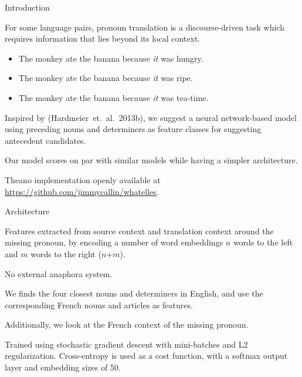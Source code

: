 \documentclass[dvipsnames,a0paper,portrait]{baposter}
\begin{document}
\begin{poster}
\begin{posterbox}[name=motivation,column=0,row=0.005]{Introduction}
\raggedright
\begin{compactitem}
\item For some language pairs, pronoun translation is a discourse-driven task which requires information that lies beyond its local context.
\begin{itemize}
    \setlength{\itemsep}{-0.2em}
    \item The monkey ate the banana because \emph{it} was hungry.
    \item The monkey ate the banana because \emph{it} was ripe.
    \item The monkey ate the banana because \emph{it} was tea-time.
\end{itemize}
\item Inspired by (Hardmeier~et.~al.~2013b), we suggest a neural network-based model using preceding nouns and determiners as feature classes for suggesting antecedent candidates.
\item Our model scores on par with similar models while having a simpler architecture.
\item Theano implementation openly available at \url{https://github.com/jimmycallin/whatelles}.
\end{compactitem}
\end{posterbox}


\begin{posterbox}[name=decoding,column=0,below=motivation]{Architecture}
\raggedright
\begin{compactitem}
\item Features extracted from source context and translation context around the missing pronoun, by encoding a number of word embeddings $n$ words to the left and $m$ words to the right ($n$+$m$).
\item No external anaphora system.
\item We finds the four closest nouns and determiners in English, and use the corresponding French nouns and articles as features.
\item Additionally, we look at the French context of the missing pronoun.
\item Trained using stochastic gradient descent with mini-batches and L2 regularization. Cross-entropy is used as a cost function, with a softmax output layer and embedding sizes of 50.
\end{compactitem}


\end{posterbox}
\end{poster}
\end{document}
